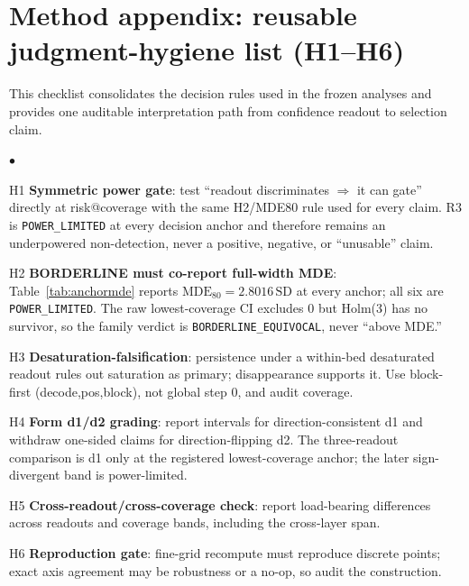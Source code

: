\documentclass{article}
\begin{document}
\label{p5:main-text-end}




\appendix
\section{Method appendix: reusable judgment-hygiene list (H1--H6)}
\label{app:hygiene}

This checklist consolidates the decision rules used in the frozen analyses and provides one
auditable interpretation path from confidence readout to selection claim.

{\small
\begin{list}{$\bullet$}{
  \setlength{\leftmargin}{1.5em}
  \setlength{\labelwidth}{1em}
  \setlength{\labelsep}{0.5em}
  \setlength{\itemsep}{1pt}
  \setlength{\parsep}{0pt}
  \setlength{\topsep}{2pt}}
  \item H1 \textbf{Symmetric power gate}: test ``readout discriminates $\Rightarrow$ it can
  gate'' directly at risk@coverage with the same H2/MDE80 rule used for every claim. R3 is
  \texttt{POWER\_LIMITED} at every decision anchor and therefore remains an underpowered
  non-detection, never a positive, negative, or ``unusable'' claim.
  \item H2 \textbf{BORDERLINE must co-report full-width MDE}: Table~\ref{tab:anchormde}
  reports $\mathrm{MDE}_{80}=2.8016\,\mathrm{SD}$ at every anchor; all six are
  \texttt{POWER\_LIMITED}. The raw lowest-coverage CI excludes 0 but Holm(3) has no survivor,
  so the family verdict is \texttt{BORDERLINE\_EQUIVOCAL}, never ``above MDE.''
  \item H3 \textbf{Desaturation-falsification}: persistence under a within-bed desaturated
  readout rules out saturation as primary; disappearance supports it. Use block-first
  (decode,pos,block), not global step 0, and audit coverage.
  \item H4 \textbf{Form d1/d2 grading}: report intervals for direction-consistent d1 and
  withdraw one-sided claims for direction-flipping d2. The three-readout comparison is d1 only
  at the registered lowest-coverage anchor; the later sign-divergent band is power-limited.
  \item H5 \textbf{Cross-readout/cross-coverage check}: report load-bearing differences across
  readouts and coverage bands, including the cross-layer span.
  \item H6 \textbf{Reproduction gate}: fine-grid recompute must reproduce discrete points;
  exact axis agreement may be robustness or a no-op, so audit the construction.
\end{list}
}
\end{document}
